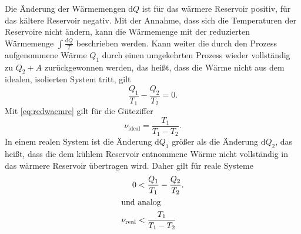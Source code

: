 \noindent Die Änderung der Wärmemengen $\mathup{d}Q$ ist für das wärmere Reservoir positiv, für das kältere Reservoir negativ.
Mit der Annahme, dass sich die Temperaturen der Reservoire nicht ändern, kann die Wärmemenge mit der reduzierten Wärmemenge $\int \frac{\mathup{d}Q}{T}$ beschrieben werden. 
Kann weiter die durch den Prozess aufgenommene Wärme $Q_1$ durch einen umgekehrten Prozess wieder vollständig zu $Q_2 + A$ zurückgewonnen werden, das heißt, dass die Wärme nicht aus dem idealen, isolierten System tritt, gilt
\begin{equation}
	\frac{Q_1}{T_1}-\frac{Q_2}{T_2} = 0.
	\label{eq:redwaemre}
\end{equation}
Mit \eqref{eq:redwaemre} gilt für die Güteziffer
\begin{equation}
	\nu_{\text{ideal}} = \frac{T_1}{T_1-T_2}.
	\label{eq:gueteziffer_ideal}
\end{equation}
In einem realen System ist die Änderung $\mathup{d}Q_1$ größer als die Änderung $\mathup{d}Q_2$, das heißt, dass die dem kühlem Reservoir entnommene Wärme nicht vollständig in das wärmere Reservoir übertragen wird.
Daher gilt für reale Systeme
\begin{align}
	 0 &< \frac{Q_1}{T_1}-\frac{Q_2}{T_2}.\\
	\intertext{und analog}
	\nu_{\text{real}} &< \frac{T_1}{T_1-T_2}
\end{align}
